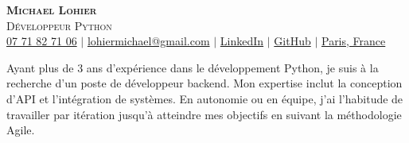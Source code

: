 \documentclass[letterpaper,11pt]{article}
\begin{document}



\begin{center}
    \textbf{\Huge \scshape Michael Lohier} \\ \vspace{5pt}
    {\LARGE \scshape Développeur Python} \\ \vspace{3pt}
    \small
    \faMobile \hspace{.5pt} \href{
      tel:33771827106
    }{07 71 82 71 06}
    $|$
    \faAt \hspace{.5pt} \href{
      mailto:lohiermichael@gmail.com
    }{lohiermichael@gmail.com}
    $|$
    \faLinkedinSquare \hspace{.5pt} \href{
      https://www.linkedin.com/in/lohiermichael/?locale=fr
    }{LinkedIn}
    $|$
    \faGithub \hspace{.5pt} \href{https://github.com/lohiermichael}{GitHub}
    $|$
    \faMapMarker \hspace{.5pt} \href{
      https://www.google.com/maps/place/Paris/@48.8588255,2.2646353,12z/data=!3m1!4b1!4m6!3m5!1s0x47e66e1f06e2b70f:0x40b82c3688c9460!8m2!3d48.856614!4d2.3522219!16zL20vMDVxdGo?entry=ttu
    }{Paris, France}

    \raggedright
    \vspace{10pt}
    Ayant plus de 3 ans d'expérience dans le développement Python, je suis à
    la recherche d'un poste de développeur backend. Mon expertise inclut la
    conception d'API et l'intégration de systèmes. En autonomie ou en équipe,
    j'ai l'habitude de travailler par itération jusqu'à atteindre mes objectifs
    en suivant la méthodologie Agile.

\end{center}
\end{document}
